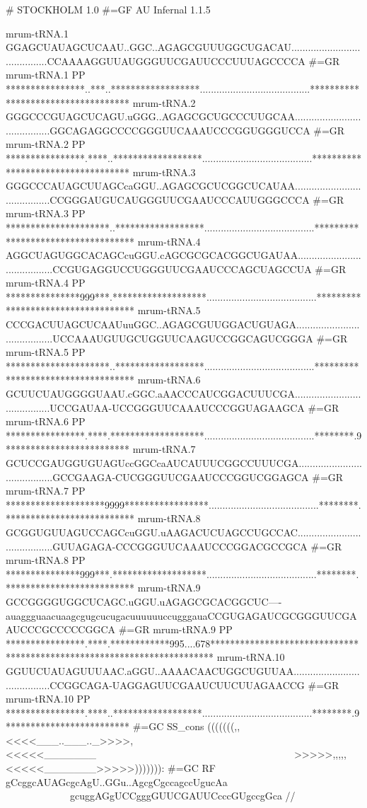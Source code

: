 \begin{tinysreoutput}
# STOCKHOLM 1.0
#=GF AU Infernal 1.1.5

mrum-tRNA.1          GGAGCUAUAGCUCAAU..GGC..AGAGCGUUUGGCUGACAU........................................CCAAAAGGUUAUGGGUUCGAUUCCCUUUAGCCCCA
#=GR mrum-tRNA.1  PP ****************..***..******************........................................***********************************
mrum-tRNA.2          GGGCCCGUAGCUCAGU.uGGG..AGAGCGCUGCCCUUGCAA........................................GGCAGAGGCCCCGGGUUCAAAUCCCGGUGGGUCCA
#=GR mrum-tRNA.2  PP ****************.****..******************........................................***********************************
mrum-tRNA.3          GGGCCCAUAGCUUAGCcaGGU..AGAGCGCUCGGCUCAUAA........................................CCGGGAUGUCAUGGGUUCGAAUCCCAUUGGGCCCA
#=GR mrum-tRNA.3  PP *********************..******************........................................***********************************
mrum-tRNA.4          AGGCUAGUGGCACAGCcuGGU.cAGCGCGCACGGCUGAUAA........................................CCGUGAGGUCCUGGGUUCGAAUCCCAGCUAGCCUA
#=GR mrum-tRNA.4  PP ***************999***.*******************........................................***********************************
mrum-tRNA.5          CCCGACUUAGCUCAAUuuGGC..AGAGCGUUGGACUGUAGA........................................UCCAAAUGUUGCUGGUUCAAGUCCGGCAGUCGGGA
#=GR mrum-tRNA.5  PP *********************..******************........................................***********************************
mrum-tRNA.6          GCUUCUAUGGGGUAAU.cGGC.aAACCCAUCGGACUUUCGA........................................UCCGAUAA-UCCGGGUUCAAAUCCCGGUAGAAGCA
#=GR mrum-tRNA.6  PP ****************.****.*******************........................................********.9*************************
mrum-tRNA.7          GCUCCGAUGGUGUAGUccGGCcaAUCAUUUCGGCCUUUCGA........................................GCCGAAGA-CUCGGGUUCGAAUCCCGGUCGGAGCA
#=GR mrum-tRNA.7  PP ********************9999*****************........................................********.**************************
mrum-tRNA.8          GCGGUGUUAGUCCAGCcuGGU.uAAGACUCUAGCCUGCCAC........................................GUUAGAGA-CCCGGGUUCAAAUCCCGGACGCCGCA
#=GR mrum-tRNA.8  PP ***************999***.*******************........................................********.**************************
mrum-tRNA.9          GCCGGGGUGGCUCAGC.uGGU.uAGAGCGCACGGCUC----auaggguaacuaagcgugcucugacuuuuuuccugggauaCCGUGAGAUCGCGGGUUCGAAUCCCGCCCCCGGCA
#=GR mrum-tRNA.9  PP ****************.****.************995....678************************************************************************
mrum-tRNA.10         GGUUCUAUAGUUUAAC.aGGU..AAAACAACUGGCUGUUAA........................................CCGGCAGA-UAGGAGUUCGAAUCUUCUUAGAACCG
#=GR mrum-tRNA.10 PP ****************.****..******************........................................********.9*************************
#=GC SS_cons         (((((((,,<<<<___..___.._>>>>,<<<<<_______~~~~~~~~~~~~~~~~~~~~~~~~~~~~~~~~~~~~~~~~>>>>>,,,,,<<<<<_______>>>>>))))))):
#=GC RF              gCcggcAUAGcgcAgU..GGu..AgcgCgccagccUgucAa~~~~~~~~~~~~~~~~~~~~~~~~~~~~~~~~~~~~~~~~gcuggAGgUCCgggGUUCGAUUCcccGUgccgGca
//
\end{tinysreoutput}

